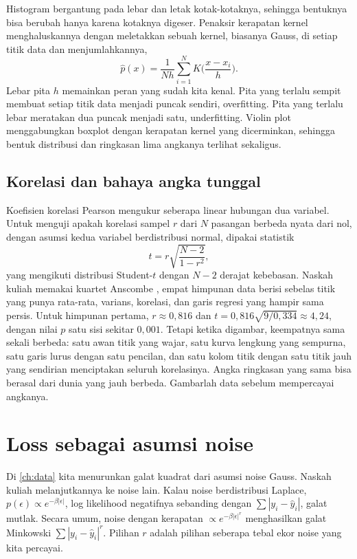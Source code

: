 Histogram bergantung pada lebar dan letak kotak-kotaknya, sehingga bentuknya bisa berubah hanya karena kotaknya digeser.
Penaksir kerapatan kernel menghaluskannya dengan meletakkan sebuah kernel, biasanya Gauss, di setiap titik data dan
menjumlahkannya,
\begin{equation}
\hat p(x)=\frac1{Nh}\sum_{i=1}^NK\Big(\frac{x-x_i}h\Big).
\end{equation}
Lebar pita $h$ memainkan peran yang sudah kita kenal. Pita yang terlalu sempit membuat setiap titik data menjadi puncak
sendiri, overfitting. Pita yang terlalu lebar meratakan dua puncak menjadi satu, underfitting. Violin plot menggabungkan
boxplot dengan kerapatan kernel yang dicerminkan, sehingga bentuk distribusi dan ringkasan lima angkanya terlihat sekaligus.

\subsection{Korelasi dan bahaya angka tunggal}

Koefisien korelasi Pearson mengukur seberapa linear hubungan dua variabel. Untuk menguji apakah korelasi sampel $r$ dari $N$
pasangan berbeda nyata dari nol, dengan asumsi kedua variabel berdistribusi normal, dipakai statistik
\begin{equation}
t=r\sqrt{\frac{N-2}{1-r^2}},
\end{equation}
yang mengikuti distribusi Student-$t$ dengan $N-2$ derajat kebebasan. Naskah kuliah memakai kuartet Anscombe
\citep{anscombe1973}, empat himpunan data berisi sebelas titik yang punya rata-rata, varians, korelasi, dan garis regresi yang
hampir sama persis. Untuk himpunan pertama, $r\approx0{,}816$ dan $t=0{,}816\sqrt{9/0{,}334}\approx4{,}24$, dengan nilai $p$ satu
sisi sekitar $0{,}001$. Tetapi ketika digambar, keempatnya sama sekali berbeda: satu awan titik yang wajar, satu kurva
lengkung yang sempurna, satu garis lurus dengan satu pencilan, dan satu kolom titik dengan satu titik jauh yang sendirian
menciptakan seluruh korelasinya. Angka ringkasan yang sama bisa berasal dari dunia yang jauh berbeda. Gambarlah data
sebelum mempercayai angkanya.

\section{Loss sebagai asumsi noise}

Di \cref{ch:data} kita menurunkan galat kuadrat dari asumsi noise Gauss. Naskah kuliah melanjutkannya ke noise lain. Kalau
noise berdistribusi Laplace, $p(\epsilon)\propto e^{-\beta|\epsilon|}$, log likelihood negatifnya sebanding dengan
$\sum|y_i-\hat y_i|$, galat mutlak. Secara umum, noise dengan kerapatan $\propto e^{-\beta|\epsilon|^r}$ menghasilkan galat
Minkowski $\sum|y_i-\hat y_i|^r$. Pilihan $r$ adalah pilihan seberapa tebal ekor noise yang kita percayai.

